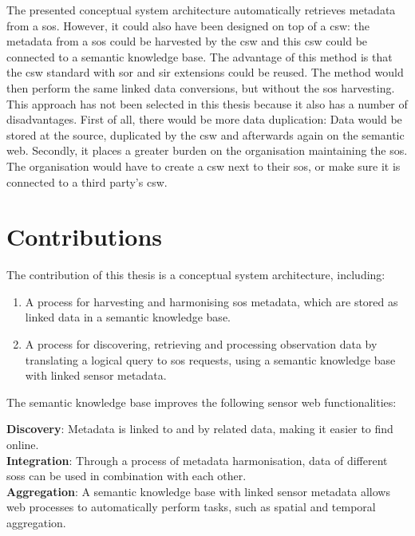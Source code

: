 The presented conceptual system architecture automatically retrieves metadata from a \ac{sos}. However, it could also have been designed on top of a \ac{csw}: the metadata from a \ac{sos} could be harvested by the \ac{csw} and this \ac{csw} could be connected to a semantic knowledge base. The advantage of this method is that the \ac{csw} standard with \acs{sor} and \acs{sir} extensions could be reused. The method would then perform the same linked data conversions, but without the \ac{sos} harvesting. This approach has not been selected in this thesis because it also has a number of disadvantages. First of all, there would be more data duplication: Data would be stored at the source, duplicated by the \ac{csw} and afterwards again on the semantic web. Secondly, it places a greater burden on the organisation maintaining the \ac{sos}. The organisation would have to create a \ac{csw} next to their \ac{sos}, or make sure it is connected to a third party's \ac{csw}.  

\section{Contributions}
\label{contributions}

The contribution of this thesis is a conceptual system architecture, including:
\begin{enumerate}
	\item A process for harvesting and harmonising \ac{sos} metadata, which are stored as linked data in a semantic knowledge base.
	\item A process for discovering, retrieving and processing observation data by translating a logical query to \ac{sos} requests, using a semantic knowledge base with linked sensor metadata. 
\end{enumerate}

The semantic knowledge base improves the following sensor web functionalities:\\
\begin{addmargin}[0.5cm]{0cm}
	\textbf{Discovery}: Metadata is linked to and by related data, making it easier to find online.\\
	\textbf{Integration}: Through a process of metadata harmonisation, data of different \aclp{sos} can be used in combination with each other.  \\
	\textbf{Aggregation}: A semantic knowledge base with linked sensor metadata allows web processes to automatically perform tasks, such as spatial and temporal aggregation. 
\end{addmargin}


